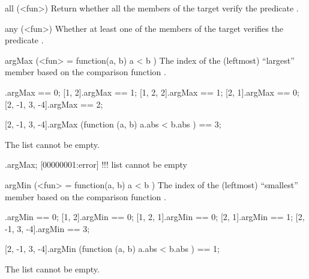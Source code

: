 \begin{urbiscriptapi}
\item[all](<fun>)
  Return whether all the members of the target verify the predicate
  .


\item[any](<fun>)
  Whether at least one of the members of the target verifies the
  predicate .


\item[argMax](<fun> = function(a, b) { a < b })%
  The index of the (leftmost) ``largest'' member based on the comparison
  function .
\begin{urbiassert}
           [1].argMax == 0;
        [1, 2].argMax == 1;
     [1, 2, 2].argMax == 1;
        [2, 1].argMax == 0;
[2, -1, 3, -4].argMax == 2;

[2, -1, 3, -4].argMax (function (a, b) { a.abs < b.abs }) == 3;
\end{urbiassert}

The list cannot be empty.

\begin{urbiscript}
[].argMax;
[00000001:error] !!! list cannot be empty
\end{urbiscript}


\item[argMin](<fun> = function(a, b) { a < b })%
  The index of the (leftmost) ``smallest'' member based on the comparison
  function .
\begin{urbiassert}
           [1].argMin == 0;
        [1, 2].argMin == 0;
     [1, 2, 1].argMin == 0;
        [2, 1].argMin == 1;
[2, -1, 3, -4].argMin == 3;

[2, -1, 3, -4].argMin (function (a, b) { a.abs < b.abs }) == 1;
\end{urbiassert}

The list cannot be empty.


\end{urbiscriptapi}
